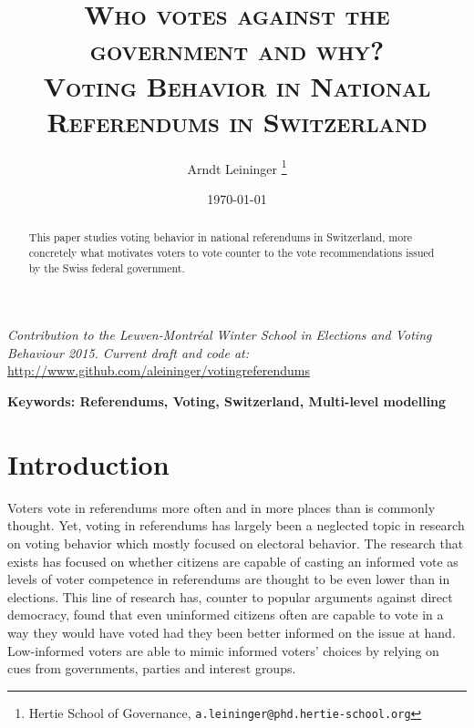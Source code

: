 \documentclass[11pt,a4paper]{article}\usepackage[]{graphicx}\usepackage[]{color}
\author{Arndt Leininger \thanks{Hertie School of Governance, \texttt{a.leininger@phd.hertie-school.org}}}
\title{\Large{\textsc{Who votes against the government and why?}}\\ \large{\textsc{Voting Behavior in National Referendums in Switzerland}}} %
\date{\today}
\begin{document}
\maketitle

{\small \textit{Contribution to the Leuven-Montréal Winter School in Elections and Voting Behaviour 2015. Current draft and code at:} \url{http://www.github.com/aleininger/votingreferendums}}



\begin{abstract}
  
	This paper studies voting behavior in national referendums in Switzerland, more concretely what motivates voters to vote counter to the vote recommendations issued by the Swiss federal government.
\end{abstract}	

\small\textbf{Keywords: Referendums, Voting, Switzerland, Multi-level modelling}

\vfill

\newpage

\section{Introduction}\label{sec:introduction}

    Voters vote in referendums more often and in more places than is commonly thought. Yet, voting in referendums has largely been a neglected topic in research on voting behavior which mostly focused on electoral behavior. The research that exists has focused on whether citizens are capable of casting an informed vote as levels of voter competence in referendums are thought to be even lower than in elections. This line of research has, counter to popular arguments against direct democracy, found that even uninformed citizens often are capable to vote in a way they would have voted had they been better informed on the issue at hand. Low-informed  voters are able to mimic informed voters' choices by relying on cues from governments, parties and interest groups.
    
\end{document}

